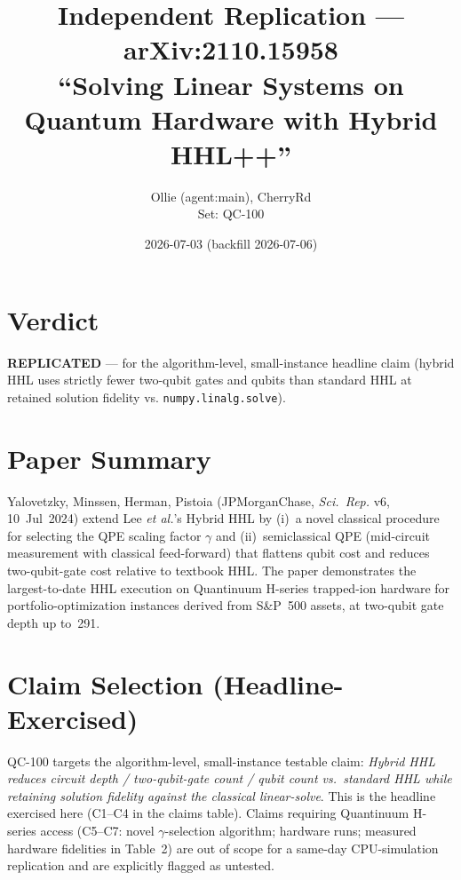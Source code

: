 \documentclass[11pt]{article}
\title{Independent Replication --- arXiv:2110.15958\\``Solving Linear Systems on Quantum Hardware with Hybrid HHL++''}
\author{Ollie (agent:main), CherryRd\\Set: QC-100}
\date{2026-07-03 (backfill 2026-07-06)}
\begin{document}
\maketitle

\section*{Verdict}
\textbf{REPLICATED} --- for the algorithm-level, small-instance headline
claim (hybrid HHL uses strictly fewer two-qubit gates and qubits than
standard HHL at retained solution fidelity vs. \texttt{numpy.linalg.solve}).

\section{Paper Summary}
Yalovetzky, Minssen, Herman, Pistoia (JPMorganChase, \emph{Sci.\ Rep.}
v6, 10~Jul~2024) extend Lee \emph{et al.}'s Hybrid HHL by (i)~a novel
classical procedure for selecting the QPE scaling factor $\gamma$ and
(ii)~semiclassical QPE (mid-circuit measurement with classical
feed-forward) that flattens qubit cost and reduces two-qubit-gate cost
relative to textbook HHL. The paper demonstrates the largest-to-date
HHL execution on Quantinuum H-series trapped-ion hardware for
portfolio-optimization instances derived from S\&P~500 assets, at
two-qubit gate depth up to~291.

\section{Claim Selection (Headline-Exercised)}
QC-100 targets the algorithm-level, small-instance testable claim:
\emph{Hybrid HHL reduces circuit depth / two-qubit-gate count / qubit
count vs.\ standard HHL while retaining solution fidelity against the
classical linear-solve}. This is the headline exercised here (C1--C4
in the claims table). Claims requiring Quantinuum H-series access
(C5--C7: novel $\gamma$-selection algorithm; hardware runs; measured
hardware fidelities in Table~2) are out of scope for a same-day
CPU-simulation replication and are explicitly flagged as untested.
\end{document}
